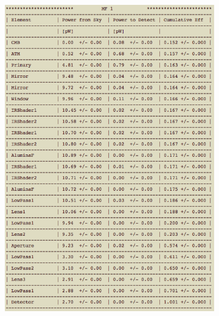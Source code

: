 \documentclass[11pt]{article} %
\begin{document}
\begin{figure}[h!]
	\centering
	\begin{subfigure}{0.49\linewidth}
		\includegraphics[width=1.0\linewidth]{Camera_optPowEx_1}
	\end{subfigure}
	\begin{subfigure}{0.49\linewidth}

\end{subfigure}
\end{figure}
\end{document}
